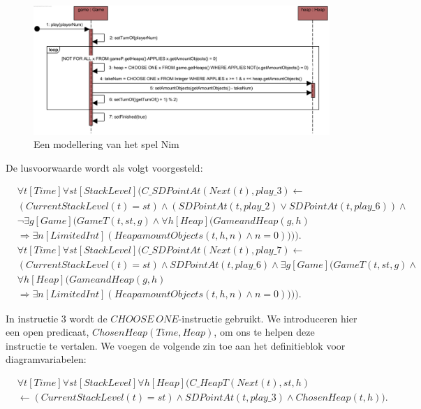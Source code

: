 \begin{figure}[H]
	\includegraphics[width=\textwidth]{chap-gedrag/seq-new-nim.png}
	\caption{Een modellering van het spel Nim}
	\label{fig:new-nim}
\end{figure}

De lusvoorwaarde wordt als volgt voorgesteld:

\begin{align}
\nonumber &\forall{t}[Time]\forall{st}[StackLevel](C\_SDPointAt(Next(t), play\_3) \leftarrow \\ \nonumber &(CurrentStackLevel(t) = st) \land (SDPointAt(t, play\_2) \lor SDPointAt(t, play\_6)) \land \\ \nonumber &\lnot{}\exists{g}[Game](GameT(t, st, g) \land{}\forall{h}[Heap](GameandHeap(g, h) \\ &\Rightarrow \exists{n}[LimitedInt](HeapamountObjects(t, h, n) \land n = 0)))). \\
\nonumber &\forall{t}[Time]\forall{st}[StackLevel](C\_SDPointAt(Next(t), play\_7) \leftarrow \\ \nonumber &(CurrentStackLevel(t) = st) \land SDPointAt(t, play\_6) \land \exists{g}[Game](GameT(t, st, g) \land \\ \nonumber &\forall{h}[Heap](GameandHeap(g, h) \\ &\Rightarrow \exists{n}[LimitedInt](HeapamountObjects(t, h, n) \land n = 0)))).
\end{align}

In instructie 3 wordt de $CHOOSE\ ONE$-instructie gebruikt. We introduceren hier een open predicaat, $ChosenHeap(Time, Heap)$, om ons te helpen deze instructie te vertalen. We voegen de volgende zin toe aan het definitieblok voor diagramvariabelen:

\begin{align}
\nonumber &\forall{t}[Time]\forall{st}[StackLevel]\forall{h}[Heap](C\_HeapT(Next(t), st, h) \\ &\leftarrow (CurrentStackLevel(t) = st) \land SDPointAt(t, play\_3) \land ChosenHeap(t, h)).
\end{align}

